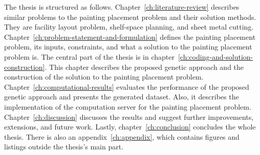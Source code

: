 The thesis is structured as follows.
Chapter~\ref{ch:literature-review} describes similar problems to the painting placement problem and their solution methods.
They are facility layout problem, shelf-space planning, and sheet metal cutting.
Chapter~\ref{ch:problem-statement-and-formulation} defines the painting placement problem, its inputs, constraints, and what a solution to the painting placement problem is.
The central part of the thesis is in chapter~\ref{ch:coding-and-solution-construction}.
This chapter describes the proposed genetic approach and the construction of the solution to the painting placement problem.
Chapter~\ref{ch:computational-results} evaluates the performance of the proposed genetic approach
and presents the generated dataset.
Also, it describes the implementation of the computation server for the painting placement problem.
Chapter~\ref{ch:discussion} discusses the results and suggest further improvements, extensions, and future work.
Lastly, chapter~\ref{ch:conclusion} concludes the whole thesis.
There is also an appendix~\ref{ch:appendix}, which contains figures and listings outside the thesis's main part.

